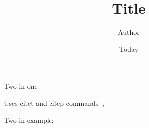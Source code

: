 \documentclass[]{article}
\begin{document}
\title{Title}
\author{Author}
\date{Today}
\maketitle

Two in one \citep{Safak:1992ub, Chatzigogos:2008uv}

Uses citet and citep commands: \citep[e.g.][]{Raychowdhury:2009hw},

Two in example: \citep[e.g.][]{NIST:2013ssi, Vesic:1975}
\end{document}
